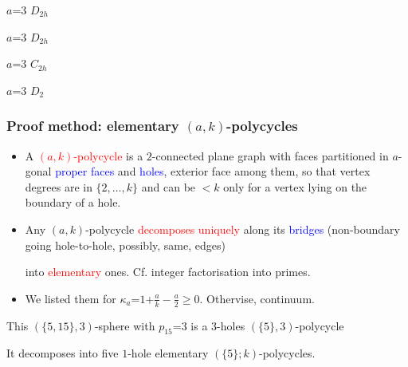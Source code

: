 \documentclass{beamer}
\begin{document}
\begin{frame}
\begin{center}
\begin{minipage}[b]{17mm}
\centering
{}\par
$a$=$3$ $D_{2h}$
\end{minipage}
\begin{minipage}[b]{17mm}
\centering
{}\par
$a$=$3$ $D_{2h}$
\end{minipage}  
\begin{minipage}[b]{17mm}
\centering
{}\par
$a$=$3$ $C_{2h}$
\end{minipage}
\begin{minipage}[b]{17mm}
\centering
{}\par
$a$=$3$ $D_{2}$
\end{minipage}
\end{center}
\end{frame}

\begin{frame}\frametitle{Proof method: elementary $(a,k)$-polycycles}
\vspace{-3.5mm}
\begin{itemize}
\item A \textcolor{red}{$(a,k)$-polycycle} is a
$2$-connected plane graph with faces partitioned
in  $a$-gonal
\textcolor{blue}{proper  faces} and 
\textcolor{blue}{holes}, exterior face among them, 
so that
vertex degrees are  in $\{2,\dots ,k\}$ and  can be  $<k$
only for a  vertex lying on the
boundary of a hole.
\item Any $(a,k)$-polycycle \textcolor{red}{decomposes uniquely} along 
its \textcolor{blue}{bridges} (non-boundary  going   
hole-to-hole, possibly, same, edges)

into  \textcolor{red}{elementary} ones. Cf. integer factorisation into 
primes.  
\item We listed them for $\kappa_a$=$1$+$\frac{a}{k}-\frac{a}{2}$$\ge$$0$. Othervise, 
continuum.
\end{itemize}

\begin{center}
\hspace{-26mm}
\begin{minipage}[b]{20mm}
\centering
{}\par
\end{minipage}
\end{center} 
This $(\{5,15\},3)$-sphere with $p_{15}$=$3$ 
is a $3$-holes $(\{5\},3)$-polycycle 

It decomposes into five
$1$-hole elementary $(\{5\};k)$-polycycles.

\end{frame} 
\end{document}
